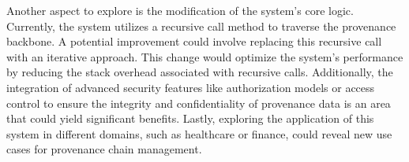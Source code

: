 \documentclass[
  digital,     %
  oneside,     %
  nosansbold,  %
  nocolorbold, %
  lof,         %
  lot,         %
]{fithesis4}
\begin{document}
Another aspect to explore is the modification of the system's core logic. Currently, the system utilizes a recursive call method to traverse the provenance backbone. A potential improvement could involve replacing this recursive call with an iterative approach. This change would optimize the system's performance by reducing the stack overhead associated with recursive calls. Additionally, the integration of advanced security features like authorization models or access control to ensure the integrity and confidentiality of provenance data is an area that could yield significant benefits. Lastly, exploring the application of this system in different domains, such as healthcare or finance, could reveal new use cases for provenance chain management.
\shorthandon{-}

\printbibliography[heading=bibintoc]
\end{document}
